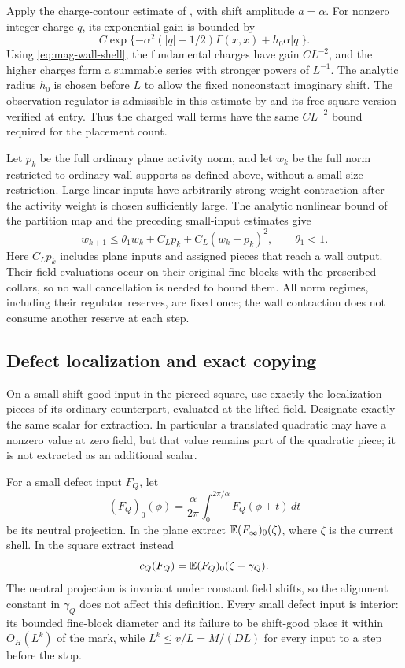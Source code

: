 Apply the charge-contour estimate of
\cite[Equations (4.26) and
(8.14)]{B}, with shift amplitude
$a=\alpha$.  For nonzero integer charge $q$, its exponential gain
is bounded by
\[
 C\exp\{-\alpha^2(|q|-1/2)\Gamma(x,x)+h_0\alpha|q|\}.
\]
Using \eqref{eq:mag-wall-shell}, the fundamental charges have gain
$CL^{-2}$, and the higher charges form a summable series with
stronger powers of $L^{-1}$.  The analytic radius $h_0$ is chosen
before $L$ to allow the fixed nonconstant imaginary shift.  The
observation regulator is admissible in this estimate by
\cite[Lemma 9.2]{B} and its free-square version
verified at entry.  Thus the charged wall terms have the same
$CL^{-2}$ bound required for the placement count.

Let $p_k$ be the full ordinary plane activity norm, and let $w_k$
be the full norm restricted to ordinary wall supports as defined
above, without a small-size restriction.  Large linear inputs
have arbitrarily strong weight contraction after the activity
weight is chosen sufficiently large.  The analytic nonlinear
bound of the partition map and the preceding small-input estimates
give
\begin{equation}\label{eq:mag-wall-recursion}
 w_{k+1}\le\theta_1w_k+C_Lp_k+C_L(w_k+p_k)^2,
 \qquad \theta_1<1.
\end{equation}
Here $C_Lp_k$ includes plane inputs and assigned pieces that reach
a wall output.  Their field evaluations occur on their original
fine blocks with the prescribed collars, so no wall cancellation
is needed to bound them.  All norm regimes, including their
regulator reserves, are fixed once; the wall contraction does not
consume another reserve at each step.

\subsection{Defect localization and exact copying}

On a small shift-good input in the pierced square, use exactly
the localization pieces of its ordinary counterpart, evaluated at
the lifted field.  Designate exactly the same scalar for
extraction.  In particular a translated quadratic may have a
nonzero value at zero field, but that value remains part of the
quadratic piece; it is not extracted as an additional scalar.

For a small defect input $F_Q$, let
\[
 (F_Q)_0(\phi)=\frac{\alpha}{2\pi}
       \int_0^{2\pi/\alpha}F_Q(\phi+t)\,dt
\]
be its neutral projection.  In the plane extract
$\mathbb E(F_\infty)_0(\zeta)$, where $\zeta$ is the current shell.
In the square extract instead
\begin{equation}\label{eq:mag-backtranslated-extraction}
 c_Q(F_Q)=\mathbb E(F_Q)_0(\zeta-\gamma_Q).
\end{equation}
The neutral projection is invariant under constant field shifts,
so the alignment constant in $\gamma_Q$ does not affect this
definition.  Every small defect input is interior: its bounded
fine-block diameter and its failure to be shift-good place it
within $O_H(L^k)$ of the mark, while $L^k\le v/L=M/(DL)$ for
every input to a step before the stop.


